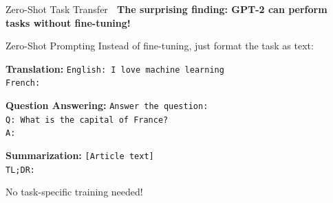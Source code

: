 \documentclass[aspectratio=169]{beamer}
\begin{document}
\begin{frame}{Zero-Shot Task Transfer 🎯}
    \textbf{The surprising finding: GPT-2 can perform tasks without fine-tuning!}

    \vspace{0.3cm}

    \begin{block}{Zero-Shot Prompting}
        Instead of fine-tuning, just format the task as text:

        \vspace{0.3cm}

        \textbf{Translation:}
        \texttt{English: I love machine learning\\
        French: }

        \vspace{0.3cm}

        \textbf{Question Answering:}
        \texttt{Answer the question:\\
        Q: What is the capital of France?\\
        A: }

        \vspace{0.3cm}

        \textbf{Summarization:}
        \texttt{[Article text]\\
        TL;DR: }
    \end{block}

    \vspace{0.3cm}

    \begin{alertblock}{No task-specific training needed!}
    \end{alertblock}
\end{frame}
\end{document}
